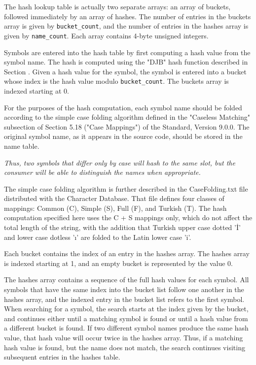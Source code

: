 The hash lookup table is actually two separate arrays: an array of
buckets, followed immediately by an array of hashes. The number of
entries in the buckets array is given by \texttt{bucket\_count}, and the number
of entries in the hashes array is given by \texttt{name\_count}. Each array
contains 4-byte unsigned integers.

Symbols are entered into the hash table by first computing a hash
value from the symbol name. The hash is computed 
using the "DJB" hash function 
described in Section .
Given a hash value for the symbol,
the symbol is entered into a bucket whose index is the hash value
modulo \texttt{bucket\_count}. The buckets array is indexed starting at 0.

For the purposes of the hash computation, each symbol name should be
folded according to the simple case folding algorithm defined in the
"Caseless Matching" subsection of Section 5.18 ("Case Mappings") of
the  Standard, Version 9.0.0. The original symbol 
name, as it appears in the source code, should be stored in the name 
table.\db

\textit{Thus, two symbols that differ only by case will hash to
the same slot, but the consumer will be able to distinguish the names
when appropriate.}

The simple case folding algorithm is further described
in the CaseFolding.txt file distributed with the  
Character Database. That file defines four classes of mappings: 
Common (C), Simple (S), Full (F), and Turkish (T). 
The hash computation specified here uses the C + S mappings only, 
which do not affect the total length of the string, with the addition 
that Turkish upper case dotted '\.{I}' and lower case dotless '\i'
are folded to the Latin lower case 'i'.

Each bucket contains the index of an entry in the hashes array. The
hashes array is indexed starting at 1, and an empty bucket is
represented by the value 0.

The hashes array contains a sequence of the full hash values for each
symbol. All symbols that have the same index into the bucket list 
follow one another in the hashes array, and the indexed entry in 
the bucket list refers to the first symbol. 
When searching for a symbol, the search 
starts at the index given by the bucket, and continues either until a
matching symbol is found or until a hash value from a different bucket
is found. If two different symbol names produce the same hash value,
that hash value will occur twice in the hashes array. Thus, if a
matching hash value is found, but the name does not match, the search
continues visiting subsequent entries in the hashes table.

